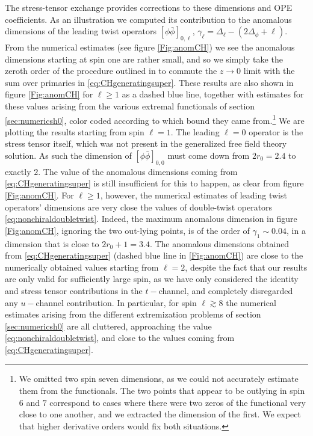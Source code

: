 The stress-tensor exchange provides corrections to these dimensions and OPE coefficients. As an illustration we computed its contribution to the anomalous dimensions of the leading twist operators $\left[\phi \bar{\phi}\right]_{0,\ell}$, $\gamma_\ell= \Delta_\ell - (2 \Delta_\phi + \ell)$. From the numerical estimates (see figure \ref{Fig:anomCH}) we see the anomalous dimensions starting at spin one are rather small, and so we simply take the zeroth order of the procedure outlined in \cite{Caron-Huot:2017vep} to commute the $z \to 0$ limit with the sum over primaries in \eqref{eq:CHgeneratingsuper}. These results are also shown in figure \ref{Fig:anomCH} for $\ell \geqslant1$ as a dashed blue line, together with estimates for these values arising from the various extremal functionals of section \ref{sec:numericsh0}, color coded according to which bound they came from.\footnote{We omitted two spin seven dimensions, as we could not accurately estimate them from the functionals. The two points that appear to be outlying in spin $6$ and $7$ correspond to cases where there were two zeros of the functional very close to one another, and we extracted the dimension of the first. We expect that higher derivative orders would fix both situations.} We are plotting the results starting from spin $\ell=1$. 
The leading $\ell=0$ operator is the stress tensor itself, which was not present in the generalized free field theory solution. As such the dimension of $\left[\phi \bar{\phi}\right]_{0,0}$ must come down from $2r_0=2.4$ to exactly $2$. The value of the anomalous dimensions coming from \eqref{eq:CHgeneratingsuper} is still insufficient for  this to happen, as clear from figure \ref{Fig:anomCH}.
For $\ell \geqslant1$, however, the numerical estimates of leading twist operators' dimensions are very close the values of double-twist operators \eqref{eq:nonchiraldoubletwist}. Indeed, the maximum anomalous dimension in figure \ref{Fig:anomCH}, ignoring the two out-lying points, is of the order of $\gamma_1 \sim 0.04$, in a dimension that is close to $2r_0+1 =3.4$.
The anomalous dimensions obtained from \eqref{eq:CHgeneratingsuper} (dashed blue line in \eqref{Fig:anomCH}) are close to the numerically obtained values starting from  $\ell=2$, despite the fact that our results are only valid for sufficiently large spin, as we have only considered the identity and stress tensor contributions in the $t-$channel, and completely disregarded any $u-$channel contribution.  In particular, for spin $\ell \gtrsim 8$ the numerical estimates arising from the different extremization problems of section \ref{sec:numericsh0} are all cluttered, approaching the value \eqref{eq:nonchiraldoubletwist}, and close to the values coming from \eqref{eq:CHgeneratingsuper}.

